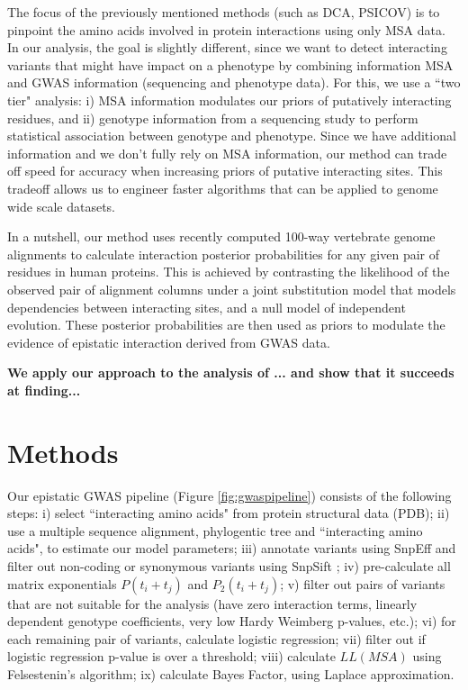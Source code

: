 The focus of the previously mentioned methods (such as DCA, PSICOV) is to pinpoint the amino acids involved in protein interactions using only MSA data. In our analysis, the goal is slightly different, since we want to detect interacting variants that might have impact on a phenotype by combining information MSA and GWAS information (sequencing and phenotype data). For this, we use a ``two tier" analysis: i) MSA information modulates our priors of putatively interacting residues, and ii) genotype information from a sequencing study to perform statistical association between genotype and phenotype. Since we have additional information and we don’t fully rely on MSA information, our method can trade off speed for accuracy when increasing priors of putative interacting sites. This tradeoff allows us to engineer faster algorithms that can be applied to genome wide scale datasets.

In a nutshell, our method uses recently computed 100-way vertebrate genome alignments to calculate interaction posterior probabilities for any given pair of residues in human proteins. This is achieved by contrasting the likelihood of the observed pair of alignment columns under a joint substitution model that models dependencies between interacting sites, and a null model of independent evolution.  These posterior probabilities are then used as priors to modulate the evidence of epistatic interaction derived from GWAS data. 

\textbf{We apply our approach to the analysis of ... and show that it succeeds at finding...}

\section{Methods}

Our epistatic GWAS pipeline (Figure \ref{fig:gwaspipeline}) consists of the following steps: i) select ``interacting amino acids" from protein structural data (PDB); ii) use a multiple sequence alignment, phylogentic tree and ``interacting amino acids", to estimate our model parameters; iii) annotate variants using SnpEff \cite{cingolani2012program} and filter out non-coding or synonymous variants using SnpSift \cite{cingolani2012using}; iv) pre-calculate all matrix exponentials $P(t_i+t_j)$ and $P_2(t_i+t_j)$; v) filter out pairs of variants that are not suitable for the analysis (have zero interaction terms, linearly dependent genotype coefficients, very low Hardy Weimberg p-values, etc.); vi) for each remaining pair of variants, calculate logistic regression; vii) filter out if logistic regression p-value is over a threshold; viii) calculate $LL(MSA)$ using Felsestenin’s algorithm; ix) calculate Bayes Factor, using Laplace approximation.

